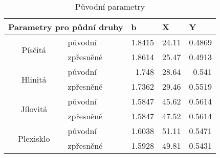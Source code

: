 \begin{table}[htbp]
  \centering
  \caption{Původní parametry}
    \label{tab:puvodni}%
    \begin{tabular}{|clrrr|}
    \hline  \hline
	\multicolumn{2}{c}{Parametry pro půdní druhy} & \multicolumn{1}{l}{b} &		\multicolumn{1}{l}{X} & \multicolumn{1}{l}{Y} \\
    \hline  
	\multirow{2}[0]{*}{Písčitá} & původní & 1.8415 & 24.11 & 0.4869 \\
      & zpřesněné & 1.8614 & 25.47 & 0.4913 \\
          \hline
	\multirow{2}[0]{*}{Hlinitá} & původní & 1.748 & 28.64 & 0.541 \\
      & zpřesněné & 1.7362 & 29.46 & 0.5519 \\
          \hline
	\multirow{2}[0]{*}{Jílovitá} & původní & 1.5847 & 45.62 & 0.5614 \\
      & zpřesněné & 1.5847 & 47.52 & 0.5614 \\
          \hline
	\multirow{2}[0]{*}{Plexisklo} & původní & 1.6038 & 51.11 & 0.5471 \\
      & zpřesněné & 1.5928 & 49.81 & 0.5431 \\
          \hline  \hline
    \end{tabular}%

\end{table}%
